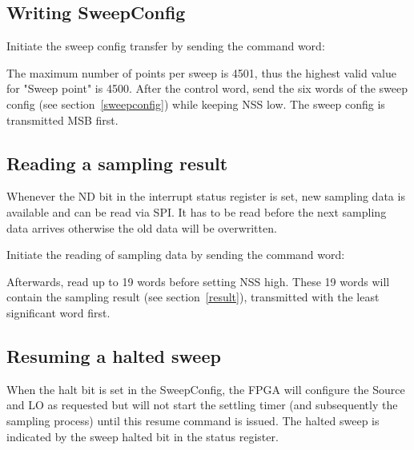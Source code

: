 \documentclass{article}
\newcommand{\bitrect}[2]{
  \begin{pgfonlayer}{foreground}
    \draw [thick] (0,0) rectangle (#1,1);
    \pgfmathsetmacro\result{#1-1}
    \foreach \x in {1,...,\result}
      \draw [thick] (\x,1) -- (\x, 0.8);
  \end{pgfonlayer}
  \bitlabels{#1}{#2}
}
\newcommand{\rwbits}[3]{
  \draw [thick] (#1,0) rectangle ++(#2,1) node[pos=0.5]{#3};
  \pgfmathsetmacro\start{#1+0.5}
  \pgfmathsetmacro\finish{#1+#2-0.5}
}
\newcommand{\robits}[3]{
  \begin{pgfonlayer}{background}
    \draw [thick, fill=lightgray] (#1,0) rectangle ++(#2,1) node[pos=0.5]{#3};
  \end{pgfonlayer}
  \pgfmathsetmacro\start{#1+0.5}
  \pgfmathsetmacro\finish{#1+#2-0.5}
}
\newcommand{\bitlabels}[2]{
  \foreach \bit in {1,...,#1}{
     \pgfmathsetmacro\result{#2}
     \node [above] at (\bit-0.5, 1) {\pgfmathprintnumber{\result}};
   }
}
\begin{document}
\subsection{Writing SweepConfig}
Initiate the sweep config transfer by sending the command word:
\begin{center}
\end{center}
The maximum number of points per sweep is 4501, thus the highest valid value for "Sweep point" is 4500. After the control word, send the six words of the sweep config (see section~\ref{sweepconfig}) while keeping NSS low. The sweep config is transmitted MSB first.

\subsection{Reading a sampling result}
Whenever the ND bit in the interrupt status register is set, new sampling data is available and can be read via SPI. It has to be read before the next sampling data arrives otherwise the old data will be overwritten.

Initiate the reading of sampling data by sending the command word:
\begin{center}
\end{center}
Afterwards, read up to 19 words before setting NSS high. These 19 words will contain the sampling result (see section~\ref{result}), transmitted with the least significant word first.

\subsection{Resuming a halted sweep}
When the halt bit is set in the SweepConfig, the FPGA will configure the Source and LO as requested but will not start the settling timer (and subsequently the sampling process) until this resume command is issued. The halted sweep is indicated by the sweep halted bit in the status register.
\begin{center}
\end{center}
\end{document}
